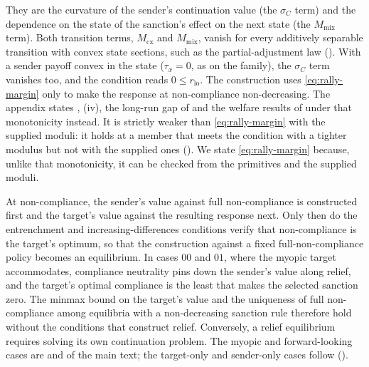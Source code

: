  They are the
curvature of the sender's continuation value (the $\sigma_C$ term) and the
dependence on the state of the sanction's effect on the next state (the
$M_{\mathrm{mix}}$ term). Both transition terms, $M_{\mathrm{cx}}$ and
$M_{\mathrm{mix}}$, vanish for every additively separable transition with convex
state sections, such as the partial-adjustment law
(). With
a sender payoff convex in the state ($\tau_x=0$, as on the family), the
$\sigma_C$ term vanishes too, and the condition reads $0\le r_{\mathrm{lo}}$.
The construction uses \eqref{eq:rally-margin} only to make the response at
non-compliance non-decreasing. The appendix states
, (iv), the
long-run gap of  and the welfare results of
 under that monotonicity instead. It is
strictly weaker than \eqref{eq:rally-margin} with the supplied moduli: it holds
at a member that meets the condition with a tighter modulus but not with the
supplied ones
(). We state \eqref{eq:rally-margin} because, unlike that
monotonicity, it can be checked from the primitives and the supplied moduli.

 At non-compliance, the sender's value against
full non-compliance is constructed first and the target's value against the resulting
response next. Only then do the entrenchment and increasing-differences
conditions verify that non-compliance is the target's optimum, so that the
construction against a fixed full-non-compliance policy becomes an equilibrium. In
cases $00$ and $01$, where the myopic target accommodates, compliance
neutrality pins down the sender's value along relief, and the target's optimal
compliance is the least that makes the selected sanction zero. The minmax bound
on the target's value and the uniqueness of full non-compliance among equilibria with
a non-decreasing sanction rule therefore hold without the conditions that
construct relief. Conversely, a relief equilibrium requires solving
its own continuation problem. The myopic and forward-looking cases are  and
 of the main text; the target-only and sender-only cases
follow ().

